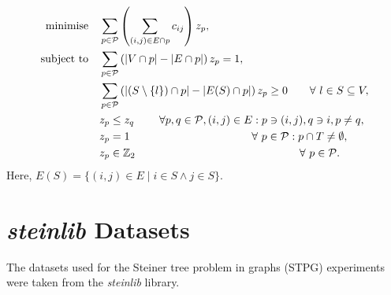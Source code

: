 \documentclass[journal]{IEEEtran}
\begin{document}
{\footnotesize
\begin{align}
\Min \quad & \displaystyle\sum_{p \in \S{P}}\left(\displaystyle\sum_{(i,j) \in E \cap p} c_{ij}\right)z_{p},\label{eq:stpg_merge}\\
\ST \quad & \displaystyle\sum_{p \in \S{P}}\left(|V\cap p| - |E\cap p|\right)z_{p} = 1,\nonumber\\
& \displaystyle\sum_{p \in \S{P}}\left(|(S\setminus\{l\}) \cap p| - |E(S)\cap p|\right)z_{p} \geq 0 \qquad \forall\ l \in S \subseteq V,\nonumber\\
& z_p \leq z_q \hspace{0.8cm} \forall  p,q\in \S{P},(i,j) \in E : p \ni (i,j),q \ni i,p \neq q, \nonumber\\
& z_p = 1 \hspace{3.9cm}  \forall\ p \in \S{P} :  p \cap T \neq \emptyset,\nonumber\\
& z_p \in \Bin \hspace{5.25cm} \forall\ p \in \S{P}\nonumber.
\end{align}
}
%
Here, \(E(S) = \{(i,j) \in E \mid i \in S \land j \in S\}.\)

\section{\emph{steinlib} Datasets}\label{app:stein_data}
The datasets used for the Steiner tree problem in graphs (STPG) experiments were taken from the \emph{steinlib}\cite{steinlib} library.
\end{document}
